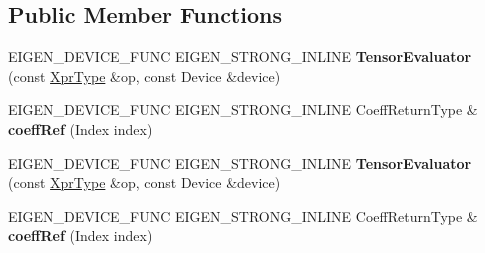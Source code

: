 \subsection*{Public Member Functions}
\begin{DoxyCompactItemize}
\item 
\mbox{\label{struct_eigen_1_1_tensor_evaluator_3_01_tensor_striding_slicing_op_3_01_start_indices_00_01_stop_b19fd6c14958f7e749ce3c389a8eda72_acadb70a4fd5e97f422b0b417069460a3}} 
E\+I\+G\+E\+N\+\_\+\+D\+E\+V\+I\+C\+E\+\_\+\+F\+U\+NC E\+I\+G\+E\+N\+\_\+\+S\+T\+R\+O\+N\+G\+\_\+\+I\+N\+L\+I\+NE {\bfseries Tensor\+Evaluator} (const \hyperlink{class_eigen_1_1_tensor_striding_slicing_op}{Xpr\+Type} \&op, const Device \&device)
\item 
\mbox{\label{struct_eigen_1_1_tensor_evaluator_3_01_tensor_striding_slicing_op_3_01_start_indices_00_01_stop_b19fd6c14958f7e749ce3c389a8eda72_a21525396cfedfdc0a671c7bf93ae5eaa}} 
E\+I\+G\+E\+N\+\_\+\+D\+E\+V\+I\+C\+E\+\_\+\+F\+U\+NC E\+I\+G\+E\+N\+\_\+\+S\+T\+R\+O\+N\+G\+\_\+\+I\+N\+L\+I\+NE Coeff\+Return\+Type \& {\bfseries coeff\+Ref} (Index index)
\item 
\mbox{\label{struct_eigen_1_1_tensor_evaluator_3_01_tensor_striding_slicing_op_3_01_start_indices_00_01_stop_b19fd6c14958f7e749ce3c389a8eda72_acadb70a4fd5e97f422b0b417069460a3}} 
E\+I\+G\+E\+N\+\_\+\+D\+E\+V\+I\+C\+E\+\_\+\+F\+U\+NC E\+I\+G\+E\+N\+\_\+\+S\+T\+R\+O\+N\+G\+\_\+\+I\+N\+L\+I\+NE {\bfseries Tensor\+Evaluator} (const \hyperlink{class_eigen_1_1_tensor_striding_slicing_op}{Xpr\+Type} \&op, const Device \&device)
\item 
\mbox{\label{struct_eigen_1_1_tensor_evaluator_3_01_tensor_striding_slicing_op_3_01_start_indices_00_01_stop_b19fd6c14958f7e749ce3c389a8eda72_a21525396cfedfdc0a671c7bf93ae5eaa}} 
E\+I\+G\+E\+N\+\_\+\+D\+E\+V\+I\+C\+E\+\_\+\+F\+U\+NC E\+I\+G\+E\+N\+\_\+\+S\+T\+R\+O\+N\+G\+\_\+\+I\+N\+L\+I\+NE Coeff\+Return\+Type \& {\bfseries coeff\+Ref} (Index index)
\end{DoxyCompactItemize}
